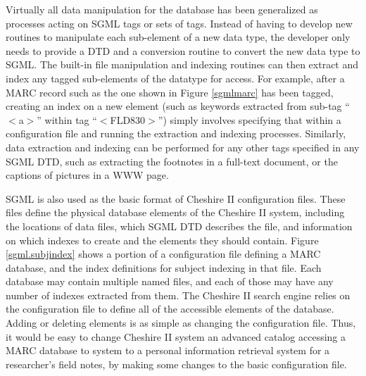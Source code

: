 Virtually all data manipulation for the database has been generalized
as processes acting on SGML tags or sets of tags. Instead of having to
develop new routines to manipulate each sub-element of a new data
type, the developer only needs to provide a DTD and a conversion
routine to convert the new data type to SGML. The built-in file
manipulation and indexing routines can then extract and index any
tagged sub-elements of the datatype for access. For example, after a
MARC record such as the one shown in Figure \ref{sgmlmarc} has been
tagged, creating an index on a new element (such as keywords extracted
from sub-tag ``$<$a$>$'' within tag ``$<$FLD830$>$'') simply involves
specifying that within a configuration file and running the extraction
and indexing processes. Similarly, data extraction and indexing can be
performed for any other tags specified in any SGML DTD, such as
extracting the footnotes in a full-text document, or the captions of
pictures in a WWW page.

SGML is also used as the basic format of Cheshire II configuration
files. These files define the physical database elements of the
Cheshire II system, including the locations of data files, which SGML
DTD describes the file, and information on which indexes to create and
the elements they should contain.  Figure \ref{sgml.subjindex} shows
a portion of a configuration file defining a MARC database, and the
index definitions for subject indexing in that file. Each database
may contain multiple named files, and each of those may have any 
number of indexes extracted from them. The Cheshire II search engine
relies on the configuration file to define all of the accessible
elements of the database. Adding or deleting elements is as simple
as changing the configuration file. Thus, it would be easy to change
Cheshire II system an advanced catalog accessing a MARC database to
system to a personal information retrieval system for a researcher's 
field notes, by making some changes to the basic configuration file.

